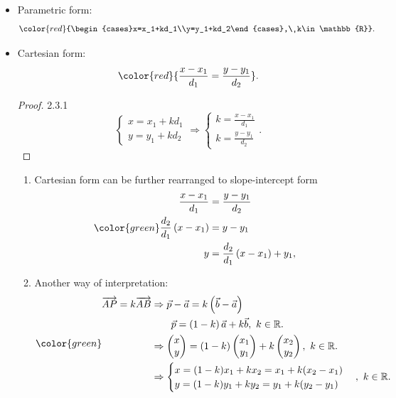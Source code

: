 \documentclass[12pt, a4paper]{article}
\begin{document}
\begin{enumerate}
\begin{itemize}
    \item Parametric form: 
    $${\color{red}{\begin{cases}x=x_1+kd_1\\y=y_1+kd_2\end{cases},\ k\in\mathbb{R}}}.$$
    \item Cartesian form: 
    $${\color{red}{\frac{x-x_1}{d_1}=\frac{y-y_1}{d_2}}}.$$
    \begin{proof}{2.3.1}{}
      $$\begin{cases}x=x_1+kd_1\\y=y_1+kd_2\end{cases}\Rightarrow\begin{cases}k=\frac{x-x_1}{d_1}\\k=\frac{y-y_1}{d_2}\end{cases}.$$
    \end{proof}
    \begin{enumerate}
      \item Cartesian form can be further rearranged to slope-intercept form
      $$\color{green}
      \begin{aligned}
        \frac{x-x_1}{d_1}&=\frac{y-y_1}{d_2}\\
        \frac{d_2}{d_1}\left(x-x_1\right)&=y-y_1\\
        y&=\frac{d_2}{d_1}\left(x-x_1\right)+y_1,\ 
      \end{aligned}$$
      {}
      \item Another way of interpretation: 
      $$\color{green}
      \begin{aligned}
        \overrightarrow{AP}=k\overrightarrow{AB}&\Rightarrow\vec{p}-\vec{a}=k\left(\vec{b}-\vec{a}\right)\\
        &\ \ \ \ \ \ \vec{p}=\left(1-k\right)\vec{a}+k\vec{b},\ k\in\mathbb{R}.\\
        &\Rightarrow \begin{pmatrix}x\\y\end{pmatrix}=\left(1-k\right)\begin{pmatrix}x_1\\y_1\end{pmatrix}+k\begin{pmatrix}x_2\\y_2\end{pmatrix},\ k\in\mathbb{R}.\\
        &\Rightarrow \begin{cases}x=(1-k)x_1+kx_2=x_1+k(x_2-x_1)\\y=(1-k)y_1+ky_2=y_1+k(y_2-y_1)\end{cases},\ k\in\mathbb{R}.\\

\end{aligned}$$
\end{enumerate}
\end{itemize}
\end{enumerate}
\end{document}
